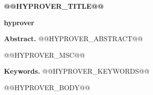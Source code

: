 \documentclass[11pt,a4paper]{amsart}
\theoremstyle{plain}
\theoremstyle{definition}
\theoremstyle{remark}
\numberwithin{equation}{section}
\begin{document}
\enlargethispage{3pt}
\begin{center}
{\Large\bfseries @@HYPROVER_TITLE@@\par}
\vskip 20pt
{\bfseries hyprover\par}
\end{center}
\vskip 10pt
\begin{center}
\begin{minipage}{14cm}
\textbf{Abstract.} @@HYPROVER_ABSTRACT@@
\par\vskip 5pt
@@HYPROVER_MSC@@
\par\vskip 5pt
\textbf{Keywords.} @@HYPROVER_KEYWORDS@@
\end{minipage}
\end{center}
\vskip 25pt

@@HYPROVER_BODY@@


\end{document}
